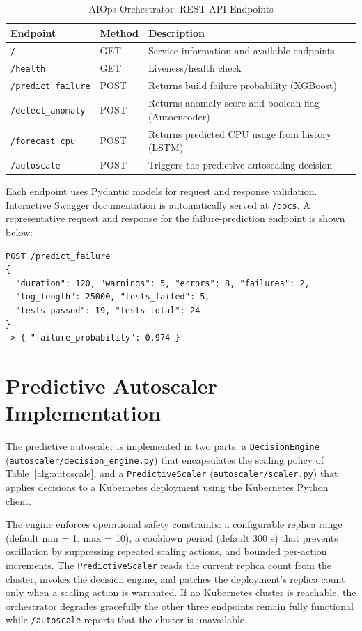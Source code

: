 \documentclass[a4paper,14pt,onecolumn]{report}
\begin{document}
\begin{table}[H]
\centering
\caption{AIOps Orchestrator: REST API Endpoints}
\label{table:api_endpoints}
\begin{tabular}{|l|l|p{6.2cm}|}
\hline
\textbf{Endpoint} & \textbf{Method} & \textbf{Description} \\
\hline
\texttt{/} & GET & Service information and available endpoints \\
\hline
\texttt{/health} & GET & Liveness/health check \\
\hline
\texttt{/predict\_failure} & POST & Returns build failure probability (XGBoost) \\
\hline
\texttt{/detect\_anomaly} & POST & Returns anomaly score and boolean flag (Autoencoder) \\
\hline
\texttt{/forecast\_cpu} & POST & Returns predicted CPU usage from history (LSTM) \\
\hline
\texttt{/autoscale} & POST & Triggers the predictive autoscaling decision \\
\hline
\end{tabular}
\end{table}

Each endpoint uses Pydantic models for request and response validation. Interactive Swagger documentation is automatically served at \texttt{/docs}. A representative request and response for the failure-prediction endpoint is shown below:

\begin{lstlisting}
POST /predict_failure
{
  "duration": 120, "warnings": 5, "errors": 8, "failures": 2,
  "log_length": 25000, "tests_failed": 5,
  "tests_passed": 19, "tests_total": 24
}
-> { "failure_probability": 0.974 }
\end{lstlisting}

\section{Predictive Autoscaler Implementation}

The predictive autoscaler is implemented in two parts: a \texttt{DecisionEngine} (\texttt{autoscaler/decision\_engine.py}) that encapsulates the scaling policy of Table~\ref{alg:autoscale}, and a \texttt{PredictiveScaler} (\texttt{autoscaler/scaler.py}) that applies decisions to a Kubernetes deployment using the Kubernetes Python client.

The engine enforces operational safety constraints: a configurable replica range (default min = 1, max = 10), a cooldown period (default 300 s) that prevents oscillation by suppressing repeated scaling actions, and bounded per-action increments. The \texttt{PredictiveScaler} reads the current replica count from the cluster, invokes the decision engine, and patches the deployment's replica count only when a scaling action is warranted. If no Kubernetes cluster is reachable, the orchestrator degrades gracefully the other three endpoints remain fully functional while \texttt{/autoscale} reports that the cluster is unavailable.
\end{document}
